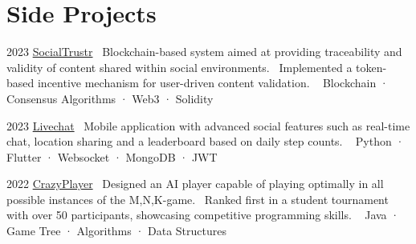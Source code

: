 \documentclass{tccv}
\begin{document}
\section{Side Projects}

\begin{yearlist}

\item{2023}
     {\href{https://github.com/manuelarto/socialtrustr}{SocialTrustr}}
     {\textbullet~Blockchain-based system aimed at providing traceability and validity of content shared within social environments. \newline
     \textbullet~Implemented a token-based incentive mechanism for user-driven content validation. \newline
     \textbullet~ Blockchain · Consensus Algorithms · Web3 · Solidity}
\item{2023}
     {\href{https://github.com/manuelarto/livechat}{Livechat}}
     {\textbullet~Mobile application with advanced social features such as real-time chat, location sharing and a leaderboard based on daily step counts. \newline
    \textbullet~ Python · Flutter · Websocket · MongoDB · JWT}
\item{2022}
     {\href{https://github.com/manuelarto/crazyplayer}{CrazyPlayer}}
     {\textbullet~Designed an AI player capable of playing optimally in all possible instances of the M,N,K-game. \newline
     \textbullet~Ranked first in a student tournament with over 50 participants, showcasing competitive programming skills. \newline
    \textbullet~ Java · Game Tree · Algorithms · Data Structures}

\end{yearlist}





\end{document}
